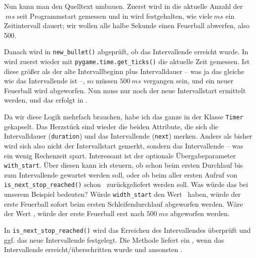 Nun kann man den Quelltext umbauen. Zuerst wird in  die aktuelle Anzahl der $~ms$ seit Programmstart gemessen und in  wird festgehalten, wie viele$~ms$ ein Zeitintervall dauert; wir wollen alle halbe Sekunde einen Feuerball abwerfen, also 500.


Danach wird in \texttt{new\_bullet()} abgeprüft, ob das Intervallende erreicht wurde. In  wird zuerst wieder mit \texttt{pygame.time.get\_ticks()} die aktuelle Zeit gemessen. Ist diese größer als der alte Intervallbeginn plus Intervalldauer -- was ja das gleiche wie das Intervallende ist --, so müssen $500~ms$ vergangen sein, und ein neuer Feuerball wird abgeworfen. Nun muss nur noch der neue Intervallstart ermittelt werden, und das erfolgt in .


Da wir diese Logik mehrfach brauchen, habe ich das ganze in der Klasse \texttt{Timer} gekapselt. Das Herzstück sind wieder die beiden Attribute, die sich die Intervalldauer (\texttt{duration}) und das Intervallende (\texttt{next})  merken. Anders als bisher wird sich also nicht der Intervallstart gemerkt, sondern das Intervallende -- was ein wenig Rechenzeit spart. Interessant ist der optionale Übergabeparameter \texttt{with\_start}. Über diesen kann ich steuern, ob schon beim ersten Durchlauf bis zum Intervallende gewartet werden soll, oder ob beim aller ersten Aufruf von \texttt{is\_next\_stop\_reached()} schon \true\ zurückgeliefert werden soll. Was würde das bei unserem Beispiel bedeuten? Würde \texttt{width\_start} den Wert \true\ haben, würde der erste Feuerball sofort beim ersten Schleifendurchlauf abgeworfen werden. Wäre der Wert \false, würde der erste Feuerball erst nach $500~ms$ abgeworfen werden.

In \texttt{is\_next\_stop\_reached()} wird das Erreichen des Intervallendes überprüft und ggf. das neue Intervallende festgelegt. Die Methode liefert ein \true, wenn das Intervallende erreicht/überschritten wurde und ansonsten \false.


